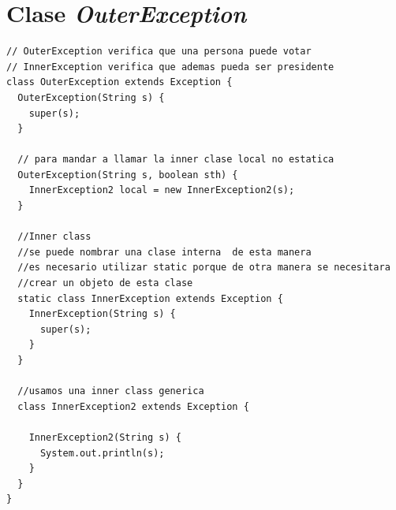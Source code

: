 \documentclass[11pt, twocolumn]{article}
\begin{document}
  \section*{Clase \textit{OuterException}}
  \begin{lstlisting}
// OuterException verifica que una persona puede votar
// InnerException verifica que ademas pueda ser presidente 
class OuterException extends Exception {
  OuterException(String s) {
    super(s);
  }
  
  // para mandar a llamar la inner clase local no estatica
  OuterException(String s, boolean sth) {
    InnerException2 local = new InnerException2(s);
  }

  //Inner class
  //se puede nombrar una clase interna  de esta manera
  //es necesario utilizar static porque de otra manera se necesitara
  //crear un objeto de esta clase
  static class InnerException extends Exception {
    InnerException(String s) {
      super(s);
    }
  }
  
  //usamos una inner class generica 
  class InnerException2 extends Exception {
    
    InnerException2(String s) {
      System.out.println(s);
    }
  }
}    
  \end{lstlisting}
\end{document}
